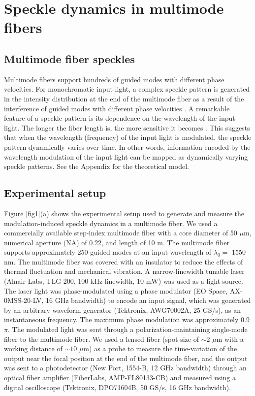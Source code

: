 \documentclass{article}
\begin{document}
\section{Speckle dynamics in multimode fibers}
\subsection{Multimode fiber speckles}
Multimode fibers support hundreds of guided modes with different phase
velocities. 
%
For monochromatic input light, 
a complex speckle pattern is generated in the intensity distribution at 
the end of the multimode fiber as a result of the interference of guided modes with 
different phase velocities \cite{Imai1980,Rawson1980}.
%
A remarkable feature of a speckle pattern is its dependence on the wavelength of
the input light. 
%
The longer the fiber length is, the more
sensitive it becomes \cite{Rawson1980,Redding2013}. 
%
This suggests that when the wavelength (frequency) of the
input light is modulated, the speckle pattern dynamically varies over
time. 
%
In other words, information encoded by the wavelength modulation of the input
light can be mapped as dynamically varying speckle patterns.
%
See the Appendix for the theoretical model.
 
\subsection{Experimental setup}
%
Figure \ref{fig1}(a) shows the experimental setup 
used to generate and measure the modulation-induced speckle dynamics in
a multimode fiber.
%  
We used a commercially available step-index multimode fiber with a
core diameter of 50 $\mu$m, numerical aperture (NA) of 0.22, and length
of 10 m. 
%
The multimode fiber supports approximately 250 guided modes at an input
wavelength of $\lambda_0 =$ 1550 nm. 
%
The multimode fiber was covered with an insulator to reduce the effects
of thermal fluctuation and mechanical vibration.
%
A narrow-linewidth tunable laser (Alnair Labs, TLG-200, 100 kHz linewidth, 10 mW) 
was used as a light source. 
%
The laser light was phase-modulated using a phase modulator (EO Space,
AX-0MSS-20-LV, 16 GHz bandwidth) to encode an input signal, 
which was generated by an arbitrary waveform
generator (Tektronix, AWG70002A, 25 GS/s), as an instantaneous
frequency.
%
The maximum phase modulation was approximately 0.9$\pi$.
%
The modulated light was sent through a
polarization-maintaining single-mode fiber to the multimode fiber. 
%
We used a lensed fiber (spot size of $\sim 2$ $\mu$m with a working
distance of $\sim 10$ $\mu$m) as a probe to measure the time-variation of the output near the focal
position at the end of the multimode fiber, and the output was sent
to a photodetector (New Port, 1554-B, 12 GHz bandwidth) through an optical
fiber amplifier (FiberLabs, AMP-FL80133-CB) and measured using a digital
oscilloscope (Tektronix, DPO71604B, 50 GS/s, 16 GHz bandwidth). 
%
\end{document}
